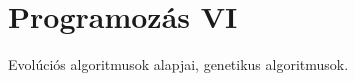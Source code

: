 \documentclass[../../main.tex]{subfiles}
\begin{document}
\section{Programozás VI}

\begin{fulltheorem}
	Evolúciós algoritmusok alapjai, genetikus algoritmusok.
\end{fulltheorem}
\end{document}
